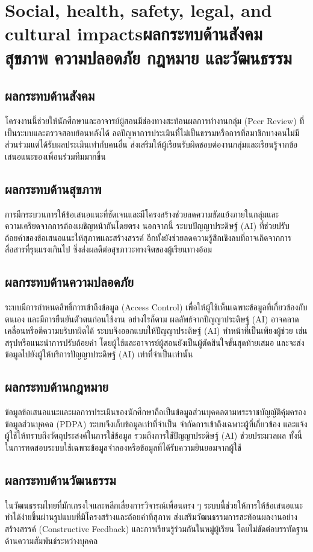 \section{\ifenglish Social, health, safety, legal, and cultural impacts\else ผลกระทบด้านสังคม สุขภาพ ความปลอดภัย กฎหมาย และวัฒนธรรม\fi}

\subsection{ผลกระทบด้านสังคม}

โครงงานนี้ช่วยให้นักศึกษาและอาจารย์ผู้สอนมีช่องทางสะท้อนผลการทำงานกลุ่ม (Peer Review) ที่เป็นระบบและตรวจสอบย้อนหลังได้ ลดปัญหาการประเมินที่ไม่เป็นธรรมหรือการที่สมาชิกบางคนไม่มีส่วนร่วมแต่ได้รับผลประเมินเท่ากับคนอื่น ส่งเสริมให้ผู้เรียนรับผิดชอบต่องานกลุ่มและเรียนรู้จากข้อเสนอแนะของเพื่อนร่วมทีมมากขึ้น

\subsection{ผลกระทบด้านสุขภาพ}

การมีกระบวนการให้ข้อเสนอแนะที่ชัดเจนและมีโครงสร้างช่วยลดความขัดแย้งภายในกลุ่มและความเครียดจากการต้องเผชิญหน้ากันโดยตรง นอกจากนี้ ระบบปัญญาประดิษฐ์ (AI) ที่ช่วยปรับถ้อยคำของข้อเสนอแนะให้สุภาพและสร้างสรรค์ อีกทั้งยังช่วยลดความรู้สึกเชิงลบที่อาจเกิดจากการสื่อสารที่รุนแรงเกินไป ซึ่งส่งผลดีต่อสุขภาวะทางจิตของผู้เรียนทางอ้อม

\subsection{ผลกระทบด้านความปลอดภัย}

ระบบมีการกำหนดสิทธิ์การเข้าถึงข้อมูล (Access Control) เพื่อให้ผู้ใช้เห็นเฉพาะข้อมูลที่เกี่ยวข้องกับตนเอง และมีการยืนยันตัวตนก่อนใช้งาน อย่างไรก็ตาม ผลลัพธ์จากปัญญาประดิษฐ์ (AI) อาจคลาดเคลื่อนหรือตีความบริบทผิดได้ ระบบจึงออกแบบให้ปัญญาประดิษฐ์ (AI) ทำหน้าที่เป็นเพียงผู้ช่วย เช่น สรุปหรือแนะนำการปรับถ้อยคำ โดยผู้ใช้และอาจารย์ผู้สอนยังเป็นผู้ตัดสินใจขั้นสุดท้ายเสมอ และจะส่งข้อมูลไปยังผู้ให้บริการปัญญาประดิษฐ์ (AI) เท่าที่จำเป็นเท่านั้น

\subsection{ผลกระทบด้านกฎหมาย}

ข้อมูลข้อเสนอแนะและผลการประเมินของนักศึกษาถือเป็นข้อมูลส่วนบุคคลตามพระราชบัญญัติคุ้มครองข้อมูลส่วนบุคคล (PDPA) ระบบจึงเก็บข้อมูลเท่าที่จำเป็น จำกัดการเข้าถึงเฉพาะผู้ที่เกี่ยวข้อง และแจ้งผู้ใช้ให้ทราบถึงวัตถุประสงค์ในการใช้ข้อมูล รวมถึงการใช้ปัญญาประดิษฐ์ (AI) ช่วยประมวลผล ทั้งนี้ในการทดสอบระบบใช้เฉพาะข้อมูลจำลองหรือข้อมูลที่ได้รับความยินยอมจากผู้ใช้

\subsection{ผลกระทบด้านวัฒนธรรม}

ในวัฒนธรรมไทยที่มักเกรงใจและหลีกเลี่ยงการวิจารณ์เพื่อนตรง ๆ ระบบนี้ช่วยให้การให้ข้อเสนอแนะทำได้ง่ายขึ้นผ่านรูปแบบที่มีโครงสร้างและถ้อยคำที่สุภาพ ส่งเสริมวัฒนธรรมการสะท้อนผลงานอย่างสร้างสรรค์ (Constructive Feedback) และการเรียนรู้ร่วมกันในหมู่ผู้เรียน โดยไม่ขัดต่อบรรทัดฐานด้านความสัมพันธ์ระหว่างบุคคล
